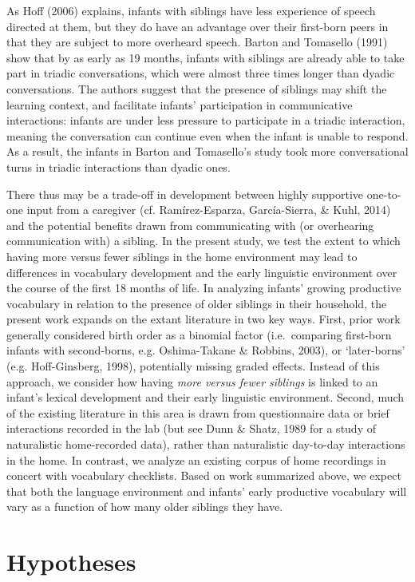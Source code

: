 \documentclass[
  english,
  man,floatsintext]{apa6}
\begin{document}
As Hoff (2006) explains, infants with siblings have less experience of speech directed at them, but they do have an advantage over their first-born peers in that they are subject to more overheard speech. Barton and Tomasello (1991) show that by as early as 19 months, infants with siblings are already able to take part in triadic conversations, which were almost three times longer than dyadic conversations. The authors suggest that the presence of siblings may shift the learning context, and facilitate infants' participation in communicative interactions: infants are under less pressure to participate in a triadic interaction, meaning the conversation can continue even when the infant is unable to respond. As a result, the infants in Barton and Tomasello's study took more conversational turns in triadic interactions than dyadic ones.

There thus may be a trade-off in development between highly supportive one-to-one input from a caregiver (cf. Ramírez-Esparza, García-Sierra, \& Kuhl, 2014) and the potential benefits drawn from communicating with (or overhearing communication with) a sibling. In the present study, we test the extent to which having more versus fewer siblings in the home environment may lead to differences in vocabulary development and the early linguistic environment over the course of the first 18 months of life. In analyzing infants' growing productive vocabulary in relation to the presence of older siblings in their household, the present work expands on the extant literature in two key ways. First, prior work generally considered birth order as a binomial factor (i.e.~comparing first-born infants with second-borns, e.g. Oshima-Takane \& Robbins, 2003), or `later-borns' (e.g. Hoff-Ginsberg, 1998), potentially missing graded effects. Instead of this approach, we consider how having \emph{more versus fewer siblings} is linked to an infant's lexical development and their early linguistic environment. Second, much of the existing literature in this area is drawn from questionnaire data or brief interactions recorded in the lab (but see Dunn \& Shatz, 1989 for a study of naturalistic home-recorded data), rather than naturalistic day-to-day interactions in the home. In contrast, we analyze an existing corpus of home recordings in concert with vocabulary checklists. Based on work summarized above, we expect that both the language environment and infants' early productive vocabulary will vary as a function of how many older siblings they have.

\hypertarget{hypotheses}{%
\section{Hypotheses}\label{hypotheses}}
\end{document}
